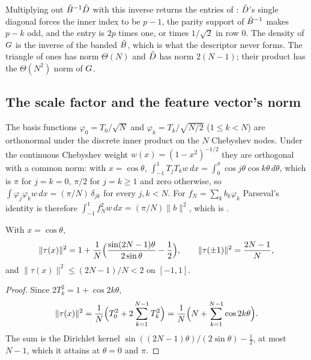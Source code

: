 Multiplying out $\tilde{B}^{-1}\tilde{D}$ with this inverse returns the entries of : $\tilde{D}$'s single diagonal forces the inner index to be $p-1$, the parity support of $\tilde{B}^{-1}$ makes $p-k$ odd, and the entry is $2p$ times one, or times $1/\sqrt2$ in row $0$. The density of $G$ is the inverse of the banded $\tilde{B}$, which is what the descriptor never forms. The triangle of ones has norm $\Theta(N)$ and $\tilde{D}$ has norm $2(N-1)$; their product has the $\Theta(N^2)$ norm of $G$.

\subsection{The scale factor and the feature vector's norm}
\label{app:eta-e}

The basis functions $\varphi_0=T_0/\sqrt N$ and $\varphi_k=T_k/\sqrt{N/2}$ ($1\le k<N$) are orthonormal under the discrete inner product on the $N$ Chebyshev nodes. Under the continuous Chebyshev weight $w(x)=(1-x^2)^{-1/2}$ they are orthogonal with a common norm: with $x=\cos\theta$, $\int_{-1}^1T_jT_kw\,dx=\int_0^\pi\cos j\theta\cos k\theta\,d\theta$, which is $\pi$ for $j=k=0$, $\pi/2$ for $j=k\ge1$ and zero otherwise, so $\int\varphi_j\varphi_kw\,dx=(\pi/N)\,\delta_{jk}$ for every $j,k<N$. For $f_N=\sum_kb_k\varphi_k$ Parseval's identity is therefore $\int_{-1}^1f_N^2w\,dx=(\pi/N)\|b\|^2$, which is .

\begin{proposition}
\label{prop:tau-norm}
With $x=\cos\theta$,
\begin{equation}
    \|\tau(x)\|^2=1+\frac1N\Bigl(\frac{\sin(2N-1)\theta}{2\sin\theta}-\frac12\Bigr),
    \qquad
    \|\tau(\pm1)\|^2=\frac{2N-1}{N},
\end{equation}
and $\|\tau(x)\|^2\le(2N-1)/N<2$ on $[-1,1]$.
\end{proposition}
\begin{proof}
Since $2T_k^2=1+\cos2k\theta$,
\begin{equation*}
    \|\tau(x)\|^2=\frac1N\Bigl(T_0^2+2\sum_{k=1}^{N-1}T_k^2\Bigr)=\frac1N\Bigl(N+\sum_{k=1}^{N-1}\cos2k\theta\Bigr).
\end{equation*}
The sum is the Dirichlet kernel $\sin((2N-1)\theta)/(2\sin\theta)-\tfrac12$, at most $N-1$, which it attains at $\theta=0$ and $\pi$.
\end{proof}

